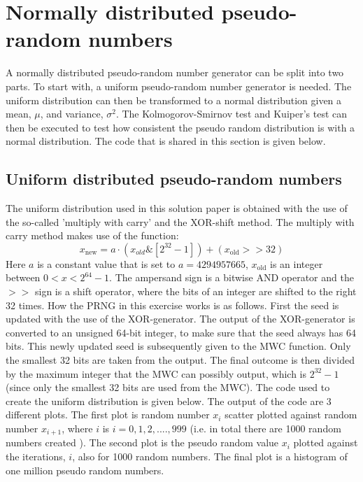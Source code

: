 
\section{Normally distributed pseudo-random numbers}
A normally distributed pseudo-random number generator can be split into two parts. To start with, a uniform pseudo-random number generator is needed. The uniform distribution can then be transformed to a normal distribution given a mean, $\mu$, and variance, $\sigma^2$. The Kolmogorov-Smirnov test and Kuiper's test can then be executed to test how consistent the pseudo random distribution is with a normal distribution. The code that is shared in this section is given below.




\subsection{Uniform distributed pseudo-random numbers}
The uniform distribution used in this solution paper is obtained with the use of the so-called 'multiply with carry' and the XOR-shift method. The multiply with carry method makes use of the function:
\begin{equation}
x_{\mathrm{new}} = a\cdot(x_{old}\& [2^{32} - 1]) + (x_\mathrm{old} >> 32)
\end{equation}
Here $a$ is a constant value that is set to $a  = 4294957665$, $x_{\mathrm{old}}$ is an integer between $0 < x < 2^{64}-1$. The ampersand sign is a bitwise AND operator and the $>>$ sign is a shift operator, where the bits of an integer are shifted to the right 32 times. How the PRNG in this exercise works is as follows. First the seed is updated with the use of the XOR-generator. The output of the XOR-generator is converted to an unsigned 64-bit integer, to make sure that the seed always has 64 bits. This newly updated seed is subsequently given to the MWC function. Only the smallest 32 bits are taken from the output. The final outcome is then divided by the maximum integer that the MWC can possibly output, which is $2^{32} - 1$ (since only the smallest 32 bits are used from the MWC).
The code used to create the uniform distribution is given below. 
The output of the code are 3 different plots. The first plot is random number $x_i$ scatter plotted against random number $x_{i+1}$, where $i$ is $i = 0,1,2,...., 999$ (i.e. in total there are 1000 random numbers created ). The second plot is the pseudo random value $x_i$ plotted against the iterations, $i$, also for 1000 random numbers. The final plot is a histogram of one million pseudo random numbers.

